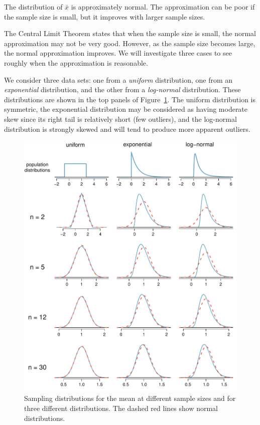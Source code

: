 \begin{termBox}{
The distribution of $\bar{x}$ is approximately normal. The approximation can be poor if the sample size is small, but it improves with larger sample sizes.}
\end{termBox}

The Central Limit Theorem states that when the sample size is small, the normal approximation may not be very good. However, as the sample size becomes large, the normal approximation improves. We will investigate three cases to see roughly when the approximation is reasonable.

We consider three data sets: one from a \emph{uniform} distribution, one from an \emph{exponential} distribution, and the other from a \emph{log-normal} distribution. These distributions are shown in the top panels of Figure~\ref{cltSimulations}. The uniform distribution is symmetric, the exponential distribution may be considered as having moderate skew since its right tail is relatively short (few outliers), and the log-normal distribution is strongly skewed and will tend to produce more apparent outliers.

\begin{figure}
   \centering
   \includegraphics[width=\textwidth]{04/figures/cltSimulations/cltSimulationsNewest}
   \caption{Sampling distributions for the mean at different sample sizes and for three different distributions. The dashed red lines show normal distributions.}
   \label{cltSimulations}
\end{figure}

